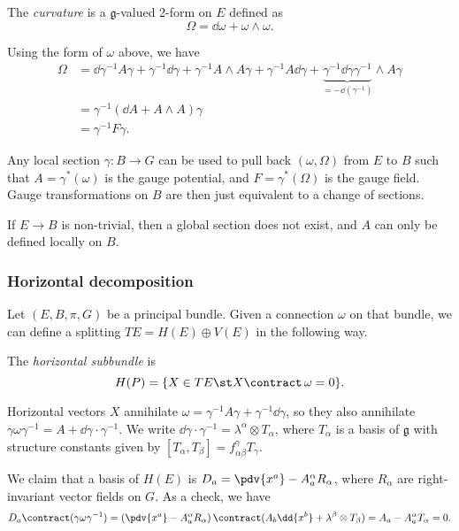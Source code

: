 \documentclass{jknotes}
\begin{document}
\begin{defn}
    The \emph{curvature} is a \(\mathfrak{g}\)-valued 2-form on \(E\) defined as
    \begin{equation}
        \Omega = \dd{\omega} + \omega\wedge\omega.
    \end{equation}
\end{defn}

Using the form of \(\omega\) above, we have
\begin{align}
    \Omega &= \dd{\gamma^{-1}A\gamma + \gamma^{-1}\dd{\gamma}} + \gamma^{-1}A\wedge A\gamma + \gamma^{-1} A \dd{\gamma} + \underbrace{\gamma^{-1}\dd{\gamma}\gamma^{-1}}_{=-\dd{(\gamma^{-1})}}\wedge A\gamma \\
           &= \gamma^{-1}(\dd{A} + A\wedge A) \gamma\\
           &= \gamma^{-1} F \gamma.
\end{align}

Any local section \(\gamma:B\to G\) can be used to pull back \((\omega,\Omega)\) from \(E\) to \(B\) such that \(A = \gamma^*(\omega)\) is the gauge potential, and \(F=\gamma^*(\Omega)\) is the gauge field. Gauge transformations on \(B\) are then just equivalent to a change of sections.

If \(E\to B\) is non-trivial, then a global section does not exist, and \(A\) can only be defined locally on \(B\).

\subsubsection*{Horizontal decomposition}
Let \((E,B,\pi,G)\) be a principal bundle. Given a connection \(\omega\) on that bundle, we can define a splitting \(TE = H(E)\oplus V(E)\) in the following way.
\begin{defn}
    The \emph{horizontal subbundle} is
    \begin{equation}
        H(P) = \{X\in TE \st X\contract\,\omega=0\}.
    \end{equation}
\end{defn}
Horizontal vectors \(X\) annihilate \(\omega = \gamma^{-1}A\gamma + \gamma^{-1}\dd{\gamma}\), so they also annihilate \(\gamma\omega\gamma^{-1}=A + \dd{\gamma}\cdot\gamma^{-1}\). We write \(\dd{\gamma}\cdot\gamma^{-1}=\lambda^\alpha\otimes T_\alpha\), where \(T_\alpha\) is a basis of \(\mathfrak{g}\) with structure constants given by \([T_\alpha,T_\beta] = f_{\alpha\beta}^\gamma T_\gamma\).

We claim that a basis of \(H(E)\) is \(D_a=\pdv{x^a} - A_a^\alpha R_\alpha\), where \(R_\alpha\) are right-invariant vector fields on \(G\). As a check, we have
\begin{equation}
    D_a\contract(\gamma\omega\gamma^{-1}) = \left(\pdv{x^a} - A_a^\alpha R_\alpha\right)\contract(A_b\dd{x^b} + \lambda^\beta\otimes T_\beta) = A_a - A^\alpha_a T_\alpha = 0.
\end{equation}
\end{document}
